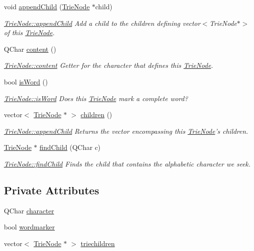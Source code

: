 \begin{DoxyCompactItemize}
void \hyperlink{class_trie_node_a2f8882ec22f1388d00a0b0a4b23c3116}{append\-Child} (\hyperlink{class_trie_node}{Trie\-Node} $\ast$child)
\begin{DoxyCompactList}\small\item\em \hyperlink{class_trie_node_a2f8882ec22f1388d00a0b0a4b23c3116}{Trie\-Node\-::append\-Child} Add a child to the children defining vector$<$\-Trie\-Node$\ast$$>$ of this \hyperlink{class_trie_node}{Trie\-Node}. \end{DoxyCompactList}\item 
Q\-Char \hyperlink{class_trie_node_afcd02716967aecb5b14a87e6bdd5ccae}{content} ()
\begin{DoxyCompactList}\small\item\em \hyperlink{class_trie_node_afcd02716967aecb5b14a87e6bdd5ccae}{Trie\-Node\-::content} Getter for the character that defines this \hyperlink{class_trie_node}{Trie\-Node}. \end{DoxyCompactList}\item 
bool \hyperlink{class_trie_node_a3fa48afcb9376feaf24c9d8acac7c076}{is\-Word} ()
\begin{DoxyCompactList}\small\item\em \hyperlink{class_trie_node_a3fa48afcb9376feaf24c9d8acac7c076}{Trie\-Node\-::is\-Word} Does this \hyperlink{class_trie_node}{Trie\-Node} mark a complete word? \end{DoxyCompactList}\item 
vector$<$ \hyperlink{class_trie_node}{Trie\-Node} $\ast$ $>$ \hyperlink{class_trie_node_a1780ceae4ef4d8aeb87decadf3114027}{children} ()
\begin{DoxyCompactList}\small\item\em \hyperlink{class_trie_node_a2f8882ec22f1388d00a0b0a4b23c3116}{Trie\-Node\-::append\-Child} Returns the vector encompassing this \hyperlink{class_trie_node}{Trie\-Node}'s children. \end{DoxyCompactList}\item 
\hyperlink{class_trie_node}{Trie\-Node} $\ast$ \hyperlink{class_trie_node_a1b5c7d87ce28b9aa7d0bcbfe33868bbc}{find\-Child} (Q\-Char c)
\begin{DoxyCompactList}\small\item\em \hyperlink{class_trie_node_a1b5c7d87ce28b9aa7d0bcbfe33868bbc}{Trie\-Node\-::find\-Child} Finds the child that contains the alphabetic character we seek. \end{DoxyCompactList}\end{DoxyCompactItemize}
\subsection*{Private Attributes}
\begin{DoxyCompactItemize}
\item 
Q\-Char \hyperlink{class_trie_node_a916f69076dcca89e4e7963cea715b730}{character}
\item 
bool \hyperlink{class_trie_node_acbd36bc970f70dcbde62e63211daa8d7}{wordmarker}
\item 
vector$<$ \hyperlink{class_trie_node}{Trie\-Node} $\ast$ $>$ \hyperlink{class_trie_node_ab3c2858f5075f4c36ec613592ab20cea}{triechildren}
\end{DoxyCompactItemize}
